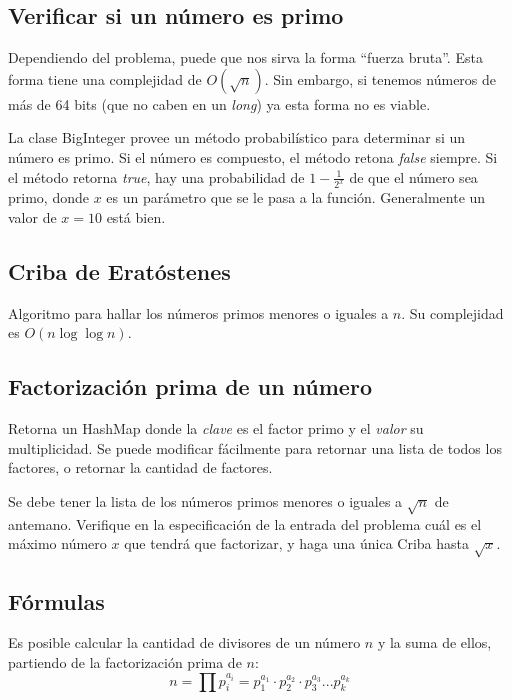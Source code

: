 \documentclass{article}
\begin{document}
\begin{multicols}{2}
	\subsection{Verificar si un número es primo}
	Dependiendo del problema, puede que nos sirva la forma ``fuerza bruta''. Esta forma tiene una complejidad de \( O(\sqrt{n}) \). Sin embargo, si tenemos números de más de 64 bits (que no caben en un \emph{long}) ya esta forma no es viable. 
	
	La clase BigInteger provee un método probabilístico para determinar si un número es primo. Si el número es compuesto, el método retona \emph{false} siempre. Si el método retorna \emph{true}, hay una probabilidad de \( 1-\frac{1}{2^x} \) de que el número sea primo, donde \(x\) es un parámetro que se le pasa a la función. Generalmente un valor de \(x = 10\) está bien.
	

	\subsection{Criba  de Eratóstenes}
	Algoritmo para hallar los números primos menores o iguales a \( n \). Su complejidad es \( O(n \log \log n) \).
	
	
	\subsection{Factorización prima de un número}
	Retorna un HashMap donde la \emph{clave} es el factor primo y el \emph{valor} su multiplicidad. Se puede modificar fácilmente para retornar una lista de todos los factores, o retornar la cantidad de factores. 
	
	Se debe tener la lista de los números primos menores o iguales a \( \sqrt{n} \) de antemano. Verifique en la especificación de la entrada del problema cuál es el máximo número \( x \) que tendrá que factorizar, y haga una única Criba hasta \( \sqrt{x} \).
	
	
	\subsection{Fórmulas}
	Es posible calcular la cantidad de divisores de un número \( n \) y la suma de ellos, partiendo de la factorización prima de \( n \):
	\[ n = \prod p_{i}^{a_{i}} = p_{1}^{a_{1}} \cdot p_{2}^{a_{2}} \cdot p_{3}^{a_{3}} ...  p_{k}^{a_{k}} \]

\end{multicols}
\end{document}

